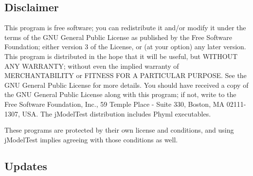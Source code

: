 \documentclass[11pt,twoside,a4paper]{article}
\begin{document}
\subsection{Disclaimer}

This program is free software; you can redistribute it and/or modify it under the terms of the GNU General Public License as published by the Free Software Foundation; either version 3 of the License, or (at your option) any later version. This program is distributed in the hope that it will be useful, but WITHOUT ANY WARRANTY; without even the implied warranty of MERCHANTABILITY or FITNESS FOR A PARTICULAR PURPOSE. See the GNU General Public License for more details. You should have received a copy of the GNU General Public License along with this program; if not, write to the Free Software Foundation, Inc., 59 Temple Place - Suite 330, Boston, MA 02111-1307, USA. The jModelTest distribution includes Phyml executables.

These programs are protected by their own license and conditions, and using jModelTest implies agreeing with those conditions as well. 

\subsection{Updates}
\end{document}
